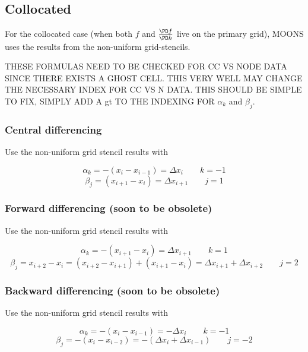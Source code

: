 \documentclass[11pt]{article}
\begin{document}
\subsection{Collocated}
For the collocated case (when both $f$ and $\frac{\PD f}{\PD h}$ live on the primary grid), MOONS uses the results from the non-uniform grid-stencils.

THESE FORMULAS NEED TO BE CHECKED FOR CC VS NODE DATA SINCE THERE EXISTS A GHOST CELL. THIS VERY WELL MAY CHANGE THE NECESSARY INDEX FOR CC VS N DATA. THIS SHOULD BE SIMPLE TO FIX, SIMPLY ADD A gt TO THE INDEXING FOR $\alpha_k$ and $\beta_j$.

\subsubsection{Central differencing}

Use the non-uniform grid stencil results with

\begin{equation}
	\alpha_k = -(x_{i} - x_{i-1}) = \Delta x_{i} \qquad k = -1
\end{equation}
\begin{equation}
	\beta_j = (x_{i+1} - x_{i}) = \Delta x_{i+1} \qquad j = 1
\end{equation}


\subsubsection{Forward differencing (soon to be obsolete)}

Use the non-uniform grid stencil results with

\begin{equation}
	\alpha_k = -(x_{i+1} - x_{i}) = \Delta x_{i+1} \qquad k = 1
\end{equation}
\begin{equation}
	\beta_j = x_{i+2} - x_{i} = (x_{i+2} - x_{i+1}) + (x_{i+1} - x_{i}) = \Delta x_{i+1} + \Delta x_{i+2} \qquad j = 2
\end{equation}

\subsubsection{Backward differencing (soon to be obsolete)}

Use the non-uniform grid stencil results with

\begin{equation}
	\alpha_k = -(x_{i} - x_{i-1}) = -\Delta x_{i} \qquad k = -1
\end{equation}
\begin{equation}
	\beta_j = -(x_{i} - x_{i-2}) = -(\Delta x_{i} + \Delta x_{i-1}) \qquad j = -2
\end{equation}
\end{document}
